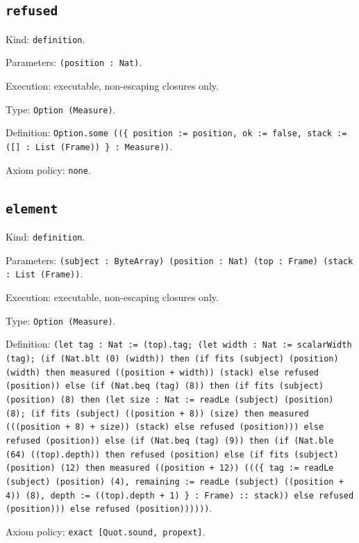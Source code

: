 \documentclass[11pt]{article}
\begin{document}
\subsection*{\texttt{refused}}
\noindent Kind: \texttt{definition}.\par
\noindent Parameters: \texttt{(position : Nat)}.\par
\noindent Execution: executable, non-escaping closures only.\par
\noindent Type: \texttt{Option (Measure)}.\par
\noindent Definition: \texttt{Option.some ((\{ position := position, ok := false, stack := ([] : List (Frame)) \} : Measure))}.\par
\noindent Axiom policy: \texttt{none}.\par
\subsection*{\texttt{element}}
\noindent Kind: \texttt{definition}.\par
\noindent Parameters: \texttt{(subject : ByteArray) (position : Nat) (top : Frame) (stack : List (Frame))}.\par
\noindent Execution: executable, non-escaping closures only.\par
\noindent Type: \texttt{Option (Measure)}.\par
\noindent Definition: \texttt{(let tag : Nat := (top).tag; (let width : Nat := scalarWidth (tag); (if (Nat.blt (0) (width)) then (if fits (subject) (position) (width) then measured ((position + width)) (stack) else refused (position)) else (if (Nat.beq (tag) (8)) then (if fits (subject) (position) (8) then (let size : Nat := readLe (subject) (position) (8); (if fits (subject) ((position + 8)) (size) then measured (((position + 8) + size)) (stack) else refused (position))) else refused (position)) else (if (Nat.beq (tag) (9)) then (if (Nat.ble (64) ((top).depth)) then refused (position) else (if fits (subject) (position) (12) then measured ((position + 12)) (((\{ tag := readLe (subject) (position) (4), remaining := readLe (subject) ((position + 4)) (8), depth := ((top).depth + 1) \} : Frame) :: stack)) else refused (position))) else refused (position))))))}.\par
\noindent Axiom policy: \texttt{exact [Quot.sound, propext]}.\par
\end{document}
